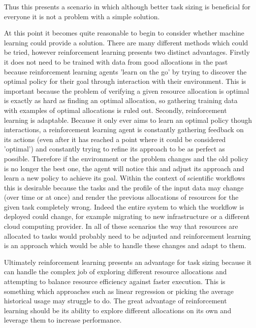 Thus this presents a scenario in which although better task sizing is beneficial for everyone it is not a problem with a simple solution.

At this point it becomes quite reasonable to begin to consider whether machine learning could provide a solution. There are many different methods which could be tried, however reinforcement learning presents two distinct advantages. Firstly it does not need to be trained with data from good allocations in the past because reinforcement learning agents 'learn on the go' by trying to discover the optimal policy for their goal through interaction with their environment. This is important because the problem of verifying a given resource allocation is optimal is exactly as hard as finding an optimal allocation, so gathering training data with examples of optimal allocations is ruled out. Secondly, reinforcement learning is adaptable. Because it only ever aims to learn an optimal policy though interactions, a reinforcement learning agent is constantly gathering feedback on its actions (even after it has reached a point where it could be considered 'optimal') and constantly trying to refine its approach to be as perfect as possible. Therefore if the environment or the problem changes and the old policy is no longer the best one, the agent will notice this and adjust its approach and learn a new policy to achieve its goal. Within the context of scientific workflows this is desirable because the tasks and the profile of the input data may change (over time or at once) and render the previous allocations of resources for the given task completely wrong. Indeed the entire system to which the workflow is deployed could change, for example migrating to new infrastructure or a different cloud computing provider. In all of these scenarios the way that resources are allocated to tasks would probably need to be adjusted and reinforcement learning is an approach which would be able to handle these changes and adapt to them.

Ultimately reinforcement learning presents an advantage for task sizing because it can handle the complex job of exploring different resource allocations and attempting to balance resource efficiency against faster execution. This is something which approaches such as linear regression or picking the average historical usage may struggle to do. The great advantage of reinforcement learning should be its ability to explore different allocations on its own and leverage them to increase performance.

